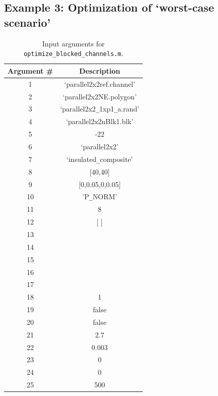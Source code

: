 \documentclass[11pt,letterpaper]{article}
\begin{document}
\FloatBarrier
\subsection{Example 3: Optimization of `worst-case scenario'}
\label{subsec_worst_cast_parallel2x2}

\begin{table}[!h]
\caption{Input arguments for \texttt{optimize\_blocked\_channels.m}.}
\label{tab_optimize_blocked_channels_inputs1}
\centering
\begin{tabular}{|c|c|}
\hline
Argument \# & Description\\
\hline
1 & `parallel2x2ref.channel' \\
\hline
2 & `parallel2x2NE.polygon'\\
\hline
3 & `parallel2x2\texttt{\_}1xp1\texttt{\_}a.rand'\\  
\hline
4 & `parallel2x2nBlk1.blk' \\
\hline
5 & -22 \\
\hline
6 & `parallel2x2'\\
\hline
7 &`insulated\texttt{\_}composite'  \\
\hline
8 & [40,40]  \\
\hline
9 & [0,0.05,0,0.05] \\
\hline
10 & 'P\texttt{\_}NORM'  \\
\hline
11 & 8  \\
\hline
12 & [ ] \\
\hline
13 & \\
\hline
14 & \\
\hline
15 & \\
\hline
16 & \\
\hline
17 & \\
\hline
18 & 1 \\
\hline
19 & false \\
\hline
20 & false \\
\hline 
21 & 2.7  \\
\hline 
22 & 0.003 \\
\hline
23 & 0 \\
\hline 
24 & 0 \\
\hline
25 & 500 \\
\hline
\end{tabular}
\end{table}
\end{document}
